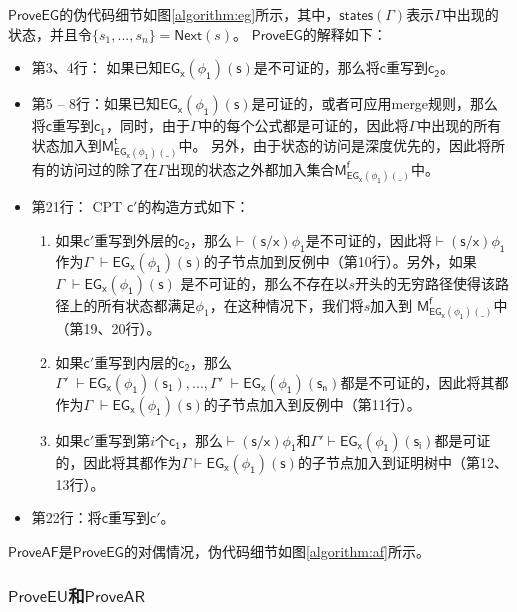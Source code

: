 $\mathsf{ProveEG}$的伪代码细节如图\ref{algorithm:eg}所示，其中，$\mathsf{states(\Gamma)}$表示$\mathsf{\Gamma}$中出现的状态，并且令$\{s_1,...,s_n\}=\textsf{Next}(s)$。
$\mathsf{ProveEG}$的解释如下：
\begin{itemize}
	\item 第3、4行： 如果已知$\mathsf{EG_x(\phi_1)(s)}$是不可证的，那么将$\mathsf{c}$重写到$\mathsf{c_2}$。
	\item 第5 -- 8行：如果已知$\mathsf{EG_x(\phi_1)(s)}$是可证的，或者可应用merge规则，那么将$\mathsf{c}$重写到$\mathsf{c_1}$，同时，由于$\mathsf{\Gamma}$中的每个公式都是可证的，因此将$\mathsf{\Gamma}$中出现的所有状态加入到$\mathsf{M_{EG_x(\phi_1)(\_)}^t}$中。
	另外，由于状态的访问是深度优先的，因此将所有的访问过的除了在$\mathsf{\Gamma}$出现的状态之外都加入集合$\mathsf{M_{EG_x(\phi_1)(\_)}^f}$中。
	\item 第21行： \textsf{CPT} $\mathsf{c'}$的构造方式如下：
	\begin{enumerate}
		\item 如果$\mathsf{c'}$重写到外层的$\mathsf{c_2}$，那么$\mathsf{\vdash(s/x)\phi_1}$是不可证的，因此将$\mathsf{\vdash(s/x)\phi_1}$作为$\Gamma\;\mathsf{\vdash EG_x(\phi_1)(s)}$的子节点加到反例中（第10行）。另外，如果 $\Gamma\;\mathsf{\vdash EG_x(\phi_1)(s)}$ 是不可证的，那么不存在以$s$开头的无穷路径使得该路径上的所有状态都满足$\phi_1$，在这种情况下，我们将$s$加入到 $\mathsf{M_{EG_x(\phi_1)(\_)}^f}$中（第19、20行）。
		
		\item 如果$\mathsf{c'}$重写到内层的$\mathsf{c_2}$，那么$\Gamma'\;\mathsf{\vdash EG_x(\phi_1)(s_1)}, ... , \Gamma'\;\mathsf{\vdash EG_x(\phi_1)(s_n)}$都是不可证的，因此将其都作为$\Gamma\;\mathsf{\vdash EG_x(\phi_1)(s)}$的子节点加入到反例中（第11行）。
		\item 如果$\mathsf{c'}$重写到第$i$个$\mathsf{c_1}$，那么$\mathsf{\vdash(s/x)\phi_1}$和$\mathsf{\Gamma'\vdash EG_x(\phi_1)(s_i)}$都是可证的，因此将其都作为$\mathsf{\Gamma\vdash EG_x(\phi_1)(s)}$的子节点加入到证明树中（第12、13行）。 
	\end{enumerate}
	\item 第22行：将$\mathsf{c}$重写到$\mathsf{c'}$。
\end{itemize}


$\mathsf{ProveAF}$是$\mathsf{ProveEG}$的对偶情况，伪代码细节如图\ref{algorithm:af}所示。


\subsubsection{$\mathsf{ProveEU}$和$\mathsf{ProveAR}$}

